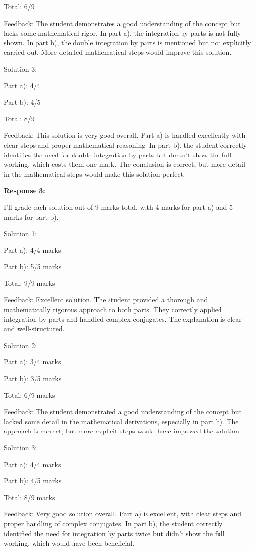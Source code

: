 \documentclass[a4paper,11pt]{article}
\begin{document}
Total: 6/9

Feedback: The student demonstrates a good understanding of the concept but lacks some mathematical rigor. In part a), the integration by parts is not fully shown. In part b), the double integration by parts is mentioned but not explicitly carried out. More detailed mathematical steps would improve this solution.

Solution 3:

Part a): 4/4

Part b): 4/5

Total: 8/9

Feedback: This solution is very good overall. Part a) is handled excellently with clear steps and proper mathematical reasoning. In part b), the student correctly identifies the need for double integration by parts but doesn't show the full working, which costs them one mark. The conclusion is correct, but more detail in the mathematical steps would make this solution perfect.

\bigskip
\textbf{Response 3:}

I'll grade each solution out of 9 marks total, with 4 marks for part a) and 5 marks for part b).

Solution 1:

Part a): 4/4 marks

Part b): 5/5 marks

Total: 9/9 marks

Feedback: Excellent solution. The student provided a thorough and mathematically rigorous approach to both parts. They correctly applied integration by parts and handled complex conjugates. The explanation is clear and well-structured.

Solution 2:

Part a): 3/4 marks

Part b): 3/5 marks

Total: 6/9 marks

Feedback: The student demonstrated a good understanding of the concept but lacked some detail in the mathematical derivations, especially in part b). The approach is correct, but more explicit steps would have improved the solution.

Solution 3:

Part a): 4/4 marks

Part b): 4/5 marks

Total: 8/9 marks

Feedback: Very good solution overall. Part a) is excellent, with clear steps and proper handling of complex conjugates. In part b), the student correctly identified the need for integration by parts twice but didn't show the full working, which would have been beneficial.
\end{document}
